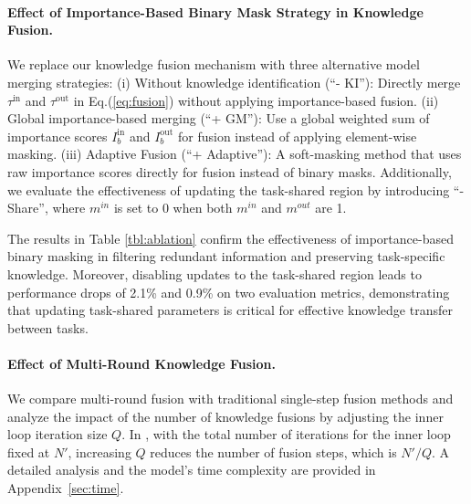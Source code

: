 

\paragraph{Effect of Importance-Based Binary Mask Strategy in Knowledge Fusion.}  
We replace our knowledge fusion mechanism with three alternative model merging strategies:
(i) Without knowledge identification (``- KI''): Directly merge \(\tau^{\text{in}}\) and \(\tau^{\text{out}}\) in Eq.(\ref{eq:fusion}) without applying importance-based fusion.  
(ii) Global importance-based merging (``+ GM''): Use a global weighted sum of importance scores \(I_b^{\text{in}}\) and \(I_b^{\text{out}}\) for fusion instead of applying element-wise masking.
(iii) Adaptive Fusion \cite{yangadamerging} (``+ Adaptive''): A soft-masking method that uses raw importance scores directly for fusion instead of binary masks.
Additionally, we evaluate the effectiveness of updating the task-shared region by introducing ``- Share'', where $m^{in}$ is set to 0 when both $m^{in}$ and $m^{out}$ are 1. 

The results in Table \ref{tbl:ablation} confirm the effectiveness of importance-based binary masking in filtering redundant information and preserving task-specific knowledge.
Moreover, disabling updates to the task-shared region leads to performance drops of 2.1\% and 0.9\% on two evaluation metrics, demonstrating that updating task-shared parameters is critical for effective knowledge transfer between tasks.




\paragraph{Effect of Multi-Round Knowledge Fusion.}  
We compare multi-round fusion with traditional single-step fusion methods and analyze the impact of the number of knowledge fusions by adjusting the inner loop iteration size $Q$.
In {\ouralg}, with the total number of iterations for the inner loop fixed at \(N'\), increasing $Q$ reduces the number of fusion steps, which is $N'/Q$. A detailed analysis and the model’s time complexity are provided in Appendix~\ref{sec:time}.

